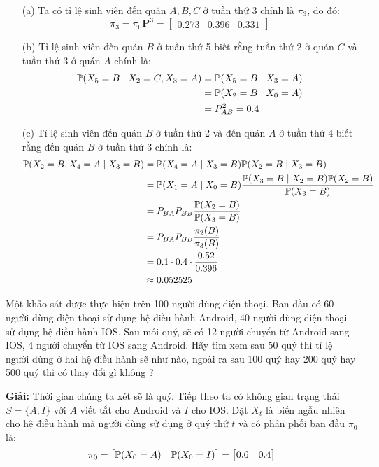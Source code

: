\begin{itemize}
    \item[(a)] Ta có tỉ lệ sinh viên đến quán $A, B, C$ ở tuần thứ 3 chính là $\pi_3$, do đó:
    $$
    \pi_3 = \pi_0 \mathbf{P}^3 = \begin{bmatrix}
        0.273 & 0.396 & 0.331
    \end{bmatrix}
    $$

    \item[(b)] Tỉ lệ sinh viên đến quán $B$ ở tuần thứ 5 biết rằng tuần thứ 2 ở quán $C$ và tuần thứ $3$ ở quán $A$ chính là:
    $$
    \begin{aligned}
    \P(X_5 = B \mid X_2 = C, X_3 = A) &= \P(X_5 = B \mid X_3 = A) \\
    &= \P(X_2 = B \mid X_0 = A)  \\
    &= P^2_{AB} = 0.4
    \end{aligned}
    $$

    \item[(c)] Tỉ lệ sinh viên đến quán $B$ ở tuần thứ 2 và đến quán $A$ ở tuần thứ 4 biết rằng đến quán $B$ ở tuần thứ 3 chính là:
    $$
    \begin{aligned}
    \P(X_2 = B, X_4 = A \mid X_3 = B) &= \P(X_4 = A \mid X_3 = B) \P(X_2 = B \mid X_3 = B) \\
    &= \P(X_1 = A \mid X_0 = B) \dfrac{\P(X_3 = B \mid X_2 = B) \P(X_2 = B)}{\P(X_3 = B)} \\
    &= P_{BA}P_{BB} \dfrac{\P(X_2 = B)}{\P(X_3 = B)} \\
    &= P_{BA}P_{BB} \dfrac{\pi_2(B)}{\pi_3(B)} \\
    &= 0.1 \cdot 0.4 \cdot \dfrac{0.52}{0.396} \\
    &\approx 0.052525 
    \end{aligned}
    $$
\end{itemize}
\pagebreak

\begin{probvn}
Một khảo sát được thực hiện trên 100 người dùng điện thoại. Ban đầu có 60 người dùng điện thoại sử dụng hệ điều hành Android, 40 người dùng điện thoại sử dụng hệ điều hành IOS. Sau mỗi quý, sẽ có 12 người chuyển từ Android sang IOS, 4 người chuyển từ IOS sang Android. Hãy tìm xem sau 50 quý thì tỉ lệ người dùng ở hai hệ điều hành sẽ như nào, ngoài ra sau 100 quý hay 200 quý hay 500 quý thì có thay đổi gì không ?
\end{probvn}

\noindent \textbf{Giải:} Thời gian chúng ta xét sẽ là quý. Tiếp theo ta có không gian trạng thái $S = \{A, I\}$ với $A$ viết tắt cho Android và $I$ cho IOS. Đặt $X_t$ là biến ngẫu nhiên cho hệ điều hành mà người dùng sử dụng ở quý thứ $t$ và có phân phối ban đầu $\pi_0$ là:
$$
\pi_0 = \begin{bmatrix}
    \P(X_0 = A) & \P(X_0 = I)
\end{bmatrix} = \begin{bmatrix}
    0.6 & 0.4
\end{bmatrix}
$$

